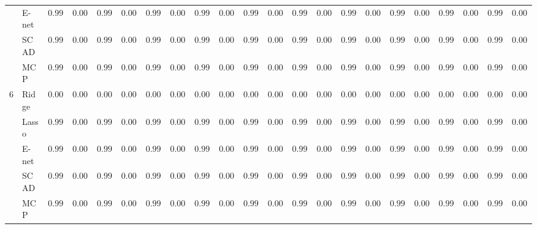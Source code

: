 \begin{tabular}{ll|ll|llllll|llllll|llllll}
 & E-net  & $0.9993$ & $0.0009$ & $0.9983$ & $0.0027$ & $0.9973$ & $0.0023$ & $0.9949$ & $0.0032$ & $0.9993$ & $0.0005$ & $0.9990$ & $0.0023$ & $0.9989$ & $0.0013$ & $0.9991$ & $0.0015$ & $0.9980$ & $0.0026$ & $0.9972$ & $0.0019$ \\
 & SCAD  & $0.9939$ & $0.0042$ & $0.9935$ & $0.0033$ & $0.9952$ & $0.0023$ & $0.9972$ & $0.0022$ & $0.9934$ & $0.0044$ & $0.9945$ & $0.0042$ & $0.9951$ & $0.0039$ & $0.9946$ & $0.0039$ & $0.9950$ & $0.0030$ & $0.9971$ & $0.0021$ \\
 & MCP  & $0.9984$ & $0.0011$ & $0.9980$ & $0.0013$ & $0.9986$ & $0.0009$ & $0.9990$ & $0.0004$ & $0.9982$ & $0.0014$ & $0.9985$ & $0.0013$ & $0.9984$ & $0.0014$ & $0.9984$ & $0.0013$ & $0.9985$ & $0.0010$ & $0.9986$ & $0.0012$ \\\hline
6 & Ridge  & $0.0000$ & $0.0000$ & $0.0000$ & $0.0000$ & $0.0000$ & $0.0000$ & $0.0000$ & $0.0000$ & $0.0000$ & $0.0000$ & $0.0000$ & $0.0000$ & $0.0000$ & $0.0000$ & $0.0000$ & $0.0000$ & $0.0000$ & $0.0000$ & $0.0000$ & $0.0000$ \\
 & Lasso  & $0.9994$ & $0.0006$ & $0.9994$ & $0.0005$ & $0.9990$ & $0.0015$ & $0.9989$ & $0.0012$ & $0.9995$ & $0.0001$ & $0.9993$ & $0.0016$ & $0.9993$ & $0.0010$ & $0.9995$ & $0.0002$ & $0.9991$ & $0.0017$ & $0.9991$ & $0.0007$ \\
 & E-net  & $0.9994$ & $0.0007$ & $0.9994$ & $0.0006$ & $0.9989$ & $0.0016$ & $0.9984$ & $0.0021$ & $0.9995$ & $0.0001$ & $0.9993$ & $0.0015$ & $0.9993$ & $0.0011$ & $0.9995$ & $0.0002$ & $0.9990$ & $0.0019$ & $0.9989$ & $0.0012$ \\
 & SCAD  & $0.9971$ & $0.0034$ & $0.9958$ & $0.0039$ & $0.9965$ & $0.0027$ & $0.9981$ & $0.0015$ & $0.9966$ & $0.0038$ & $0.9971$ & $0.0037$ & $0.9975$ & $0.0028$ & $0.9967$ & $0.0038$ & $0.9969$ & $0.0032$ & $0.9977$ & $0.0021$ \\
 & MCP  & $0.9988$ & $0.0011$ & $0.9985$ & $0.0014$ & $0.9989$ & $0.0008$ & $0.9991$ & $0.0004$ & $0.9987$ & $0.0014$ & $0.9989$ & $0.0010$ & $0.9989$ & $0.0010$ & $0.9988$ & $0.0013$ & $0.9989$ & $0.0009$ & $0.9987$ & $0.0014$ \\
\hline 
\end{tabular}

